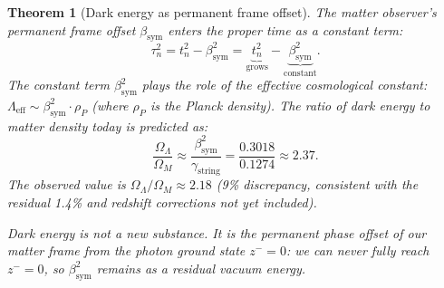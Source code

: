 \documentclass[12pt,a4paper]{article}
\newtheorem{theorem}{Theorem}[section]
\newcommand{\bsym}{\beta_{\mathrm{sym}}}
\newcommand{\gstring}{\gamma_{\mathrm{string}}}
\newcommand{\zminus}{z^-}
\begin{document}
\begin{theorem}[Dark energy as permanent frame offset]
\label{thm:dark-offset}
The matter observer's permanent frame offset $\bsym$ enters the proper
time as a constant term:
\[
  \tau_n^2 = t_n^2 - \bsym^2
  = \underbrace{t_n^2}_{\text{grows}}
  - \underbrace{\bsym^2}_{\text{constant}}.
\]
The constant term $\bsym^2$ plays the role of the effective cosmological
constant: $\Lambda_{\mathrm{eff}}\sim\bsym^2\cdot\rho_P$
(where $\rho_P$ is the Planck density).
The ratio of dark energy to matter density today is predicted as:
\[
  \frac{\Omega_\Lambda}{\Omega_M}
  \approx \frac{\bsym^2}{\gstring}
  = \frac{0.3018}{0.1274}
  \approx 2.37.
\]
The observed value is $\Omega_\Lambda/\Omega_M\approx 2.18$
(9\% discrepancy, consistent with the residual 1.4\% and redshift
corrections not yet included).

Dark energy is not a new substance. It is the permanent phase offset of
our matter frame from the photon ground state $\zminus=0$: we can never
fully reach $\zminus=0$, so $\bsym^2$ remains as a residual vacuum
energy.
\end{theorem}
\end{document}
